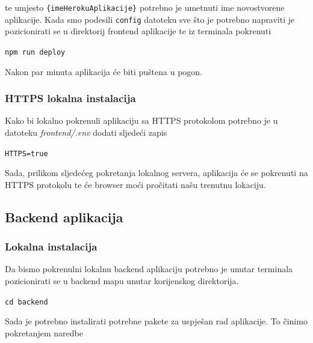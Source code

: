 								te umjesto \texttt{\{imeHerokuAplikacije\}} potrebno je umetnuti ime novostvorene aplikacije. Kada smo podesili \texttt{config} datoteku sve što je potrebno napraviti je pozicionirati se u direktorij frontend aplikacije te iz terminala pokrenuti 

								\begin{center}
										\texttt{npm run deploy}
								\end{center}
								
								Nakon par minuta aplikacija će biti puštena u pogon.

						\pagebreak

						\subsubsection*{HTTPS lokalna instalacija}

								Kako bi lokalno pokrenuli aplikaciju sa HTTPS protokolom potrebno je u datoteku \textit{frontend/.env} dodati sljedeći zapis

								\begin{center}
										\texttt{HTTPS=true}
								\end{center}

								Sada, prilikom sljedećeg pokretanja lokalnog servera, aplikacija će se pokrenuti na HTTPS protokolu te će browser moći pročitati našu trenutnu lokaciju.

						\pagebreak

						\subsection{Backend aplikacija}
	        
						\subsubsection*{Lokalna instalacija}
	        
	          		Da bismo pokrenulni lokalnu backend aplikaciju potrebno je unutar terminala pozicionirati se u backend mapu unutar korijenskog direktorija. 
	            
								\begin{center}
										\texttt{cd backend}
								\end{center}
								
								Sada je potrebno instalirati potrebne pakete za uspješan rad aplikacije. To činimo pokretanjem naredbe
								
